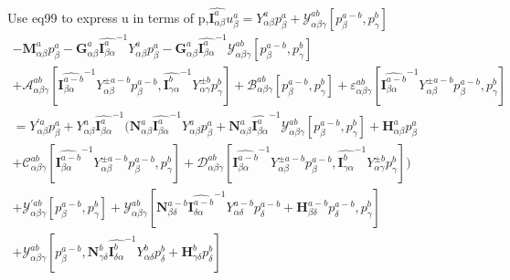 \documentclass{Note}
\begin{document}
Use eq99 to express u in terms of p,$\widehat{\textbf{I}_{\alpha\beta}^a}  u_{\beta}^a=Y_{\alpha\beta}^a p_{\beta}^a+\mathcal{Y}_{\alpha\beta\gamma}^{ab}[p_{\beta}^{a-b},p_{\gamma}^{b}]$
 \begin{equation}
\begin{aligned}
-\textbf{M}_{\alpha\beta}^a p_\beta^a - \textbf{G}_{\alpha\beta}^a  {\widehat{\textbf{I}_{\beta \alpha}^a}}^{-1}  Y_{\alpha\beta}^a p_\beta^a- \textbf{G}_{\alpha\beta}^a  {\widehat{\textbf{I}_{\beta \alpha}^a}}^{-1} \mathcal{Y}_{\alpha\beta\gamma}^{ab}[p_{\beta}^{a-b},p_{\gamma}^{b}] \\
+\mathcal{A}_{\alpha\beta\gamma}^{ab}[{\widehat{\textbf{I}_{\beta \alpha}^{a-b}}}^{-1}  Y_{\alpha\beta}^{\pm a-b} p_\beta^{a-b},{\widehat{\textbf{I}_{\gamma \alpha}^{b}}}^{-1}  Y_{\alpha\gamma}^{\pm b} p_\gamma^{b}]+\mathcal{B}_{\alpha\beta\gamma}^{ab}[p_{\beta}^{a-b},p_{\gamma}^{b}]+\varepsilon_{\alpha\beta\gamma}^{ab}[{\widehat{\textbf{I}_{\beta \alpha}^{a-b}}}^{-1}  Y_{\alpha\beta}^{\pm a-b} p_\beta^{a-b} ,p_{\gamma}^{b}]\\
={Y}_{\alpha\beta}^{'a} p_{\beta}^a 
+Y_{\alpha\beta}^{a} {\widehat{\textbf{I}_{\beta \alpha}^a}}^{-1}  (\textbf{N}_{\alpha\beta}^a   {\widehat{\textbf{I}_{\beta \alpha}^a}}^{-1}  Y_{\alpha\beta}^a p_\beta^a+\textbf{N}_{\alpha\beta}^a {\widehat{\textbf{I}_{\beta \alpha}^a}}^{-1} \mathcal{Y}_{\alpha\beta\gamma}^{ab}[p_{\beta}^{a-b},p_{\gamma}^{b}] +\textbf{H}_{\alpha\beta}^a p_\beta^a\\
+\mathcal{C}_{\alpha\beta\gamma}^{ab}[{\widehat{\textbf{I}_{\beta \alpha}^{a-b}}}^{-1}  Y_{\alpha\beta}^{\pm a-b} p_\beta^{a-b} ,p_{\gamma}^{b}]+\mathcal{D}_{\alpha\beta\gamma}^{ab}[{\widehat{\textbf{I}_{\beta \alpha}^{a-b}}}^{-1}  Y_{\alpha\beta}^{\pm a-b} p_\beta^{a-b},{\widehat{\textbf{I}_{\gamma \alpha}^{b}}}^{-1}  Y_{\alpha\gamma}^{\pm b} p_\gamma^{b}])\\
+\mathcal{Y}_{\alpha\beta\gamma}^{'ab}[p_{\beta}^{a-b},p_{\gamma}^{b}]
+\mathcal{Y}_{\alpha\beta\gamma}^{ab}[\textbf{N}_{\beta\delta}^{a-b} {\widehat{\textbf{I}_{\delta \alpha}^{a-b}}}^{-1}  Y_{\alpha\delta}^{a-b} p_\delta^{a-b} +\textbf{H}_{\beta\delta}^{a-b} p_{\delta}^{a-b},p_{\gamma}^{b}]\\
+\mathcal{Y}_{\alpha\beta\gamma}^{ab}[p_\beta^{a-b},\textbf{N}_{\gamma\delta}^{b} {\widehat{\textbf{I}_{\delta \alpha}^{b}}}^{-1}  Y_{\alpha\delta}^{b} p_\delta^{b} +\textbf{H}_{\gamma\delta}^{b} p_{\delta}^{b}]\\
\end{aligned}
\end{equation}
\end{document}
